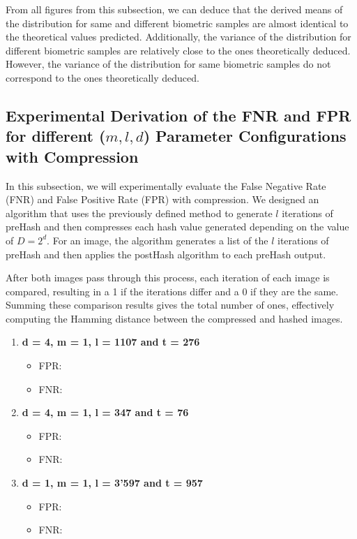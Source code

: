 From all figures from this subsection, we can deduce that the derived means of the distribution for same and different biometric samples are almost identical to the theoretical values predicted. Additionally, the variance of the distribution for different biometric samples are relatively close to the ones theoretically deduced. However, the variance of the distribution for same biometric samples do not correspond to the ones theoretically deduced. 

\subsection{Experimental Derivation of the FNR and FPR for different (\(m, l, d\)) Parameter Configurations with Compression}

In this subsection, we will experimentally evaluate the False Negative Rate (FNR) and False Positive Rate (FPR) with compression. We designed an algorithm that uses the previously defined method to generate \( l \) iterations of preHash and then compresses each hash value generated depending on the value of \(D = 2^d\). For an image, the algorithm generates a list of the \( l \) iterations of preHash and then applies the postHash algorithm to each preHash output.

After both images pass through this process, each iteration of each image is compared, resulting in a 1 if the iterations differ and a 0 if they are the same. Summing these comparison results gives the total number of ones, effectively computing the Hamming distance between the compressed and hashed images.

\begin{enumerate}
    \item \textbf{d = 4, m = 1, l = 1107 and t = 276}
        \begin{itemize}
            \item FPR: 
            \item FNR: 
        \end{itemize}
    \item \textbf{d = 4, m = 1, l = 347 and t = 76}
        \begin{itemize}
            \item FPR: 
            \item FNR: 
        \end{itemize}
    \item \textbf{d = 1, m = 1, l = 3'597 and t = 957}
        \begin{itemize}
            \item FPR: 
            \item FNR: 
        \end{itemize}
\end{enumerate}
